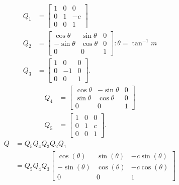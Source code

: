 \documentclass{zc-ust-hw}
\begin{document}
\begin{enumerate}
\begin{enumerate}
\begin{sol}
\begin{enumerate}[label=\arabic*)]
          \end{enumerate}
          \begin{align}
            Q_1 &= \begin{bmatrix} 
              1 & 0 & 0\\
              0 & 1 & -c\\
              0 & 0 & 1
            \end{bmatrix} \\
            Q_2 &= \begin{bmatrix} 
              \cos\theta & \sin\theta & 0\\
              -\sin\theta & \cos\theta & 0\\
              0 & 0 & 1
            \end{bmatrix} : \theta=\tan^{-1}m \\
            Q_3 &= \begin{bmatrix} 
              1 & 0 & 0 \\
              0 & -1 & 0 \\
              0 & 0 & 1
            \end{bmatrix}
          .\end{align}
          \begin{align}
            Q_4 &= \begin{bmatrix} 
              \cos\theta & -\sin\theta & 0\\
              \sin\theta & \cos\theta & 0\\
              0 & 0 & 1
            \end{bmatrix} \\
            Q_5 &= \begin{bmatrix} 
              1 & 0 & 0\\
              0 & 1 & c\\
              0 & 0 & 1
            \end{bmatrix}
          .\end{align}
          \begin{align}
            Q &= Q_5Q_4Q_3Q_2Q_1 \\
              &= Q_5Q_4Q_3\begin{bmatrix} 
                \cos(\theta) & \sin(\theta) & -c \sin(\theta) \\
                -\sin(\theta) & \cos(\theta) & -c \cos(\theta) \\
                0 & 0 & 1
              \end{bmatrix}  \\

\end{align}
\end{sol}
\end{enumerate}
\end{enumerate}
\end{document}
